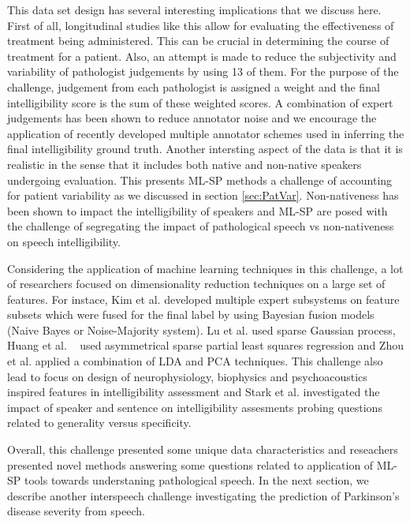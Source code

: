 \documentclass{article}
\begin{document}
This data set design has several interesting implications that we discuss here.
First of all, longitudinal studies like this allow for evaluating the effectiveness of treatment being administered.
This can be crucial in determining the course of treatment for a patient.
Also, an attempt is made to reduce the subjectivity and variability of pathologist judgements by using 13 of them.
For the purpose of the challenge, judgement from each pathologist is assigned a weight and the final intelligibility score is the sum of these weighted scores.
A combination of expert judgements has been shown to reduce annotator noise \cite{} and we encourage the application of recently developed multiple annotator schemes used in inferring the final intelligibility ground truth. 
Another intersting aspect of the data is that it is realistic in the sense that it includes both native and non-native speakers undergoing evaluation.
This presents ML-SP methods a challenge of accounting for patient variability as we discussed in section \ref{sec:PatVar}.
Non-nativeness has been shown to impact the intelligibility of speakers \cite{van2001intelligibility} and ML-SP are posed with the challenge of segregating the impact of pathological speech vs non-nativeness on speech intelligibility. 

Considering the application of machine learning techniques in this challenge, a lot of researchers focused on dimensionality reduction techniques on a large set of features. 
For instace, Kim et al. \cite{kim2012intelligibility} developed multiple expert subsystems on feature subsets which were fused for the final label by using Bayesian fusion models (Naive Bayes or Noise-Majority system).
Lu et al. \cite{lu2012predicting} used sparse Gaussian process, Huang et al. ~\cite{huang2012detecting} used asymmetrical sparse partial least squares regression and Zhou et al. \cite{zhou2012automatic} applied a combination of LDA and PCA techniques.
This challenge also lead to focus on design of neurophysiology, biophysics and psychoacoustics \cite{zhou2012automatic} inspired features in intelligibility assessment and Stark et al. \cite{stark2012interspeech} investigated the impact of speaker and sentence on intelligibility assesments probing questions related to generality versus specificity.

Overall, this challenge presented some unique data characteristics and reseachers presented novel methods answering some questions related to application of ML-SP tools towards understaning pathological speech.
In the next section, we describe another interspeech challenge investigating the prediction of Parkinson's disease severity from speech. 
\end{document}
